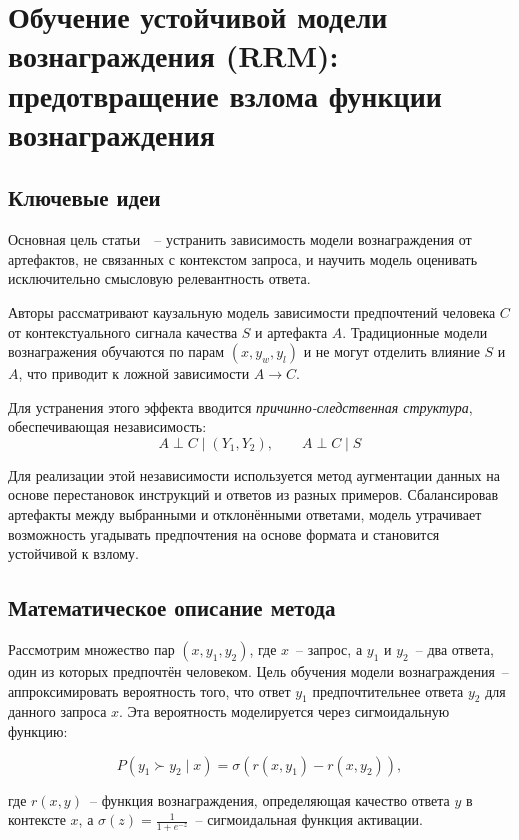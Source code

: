 \section{Обучение устойчивой модели вознаграждения (RRM): предотвращение взлома функции вознаграждения}

\subsection{Ключевые идеи}

Основная цель статьи~\cite{liu2025rrmrobustrewardmodel}~-- устранить зависимость модели вознаграждения от артефактов, не связанных с контекстом запроса, и научить модель оценивать исключительно смысловую релевантность ответа.

Авторы рассматривают каузальную модель зависимости предпочтений человека $C$ от контекстуального сигнала качества $S$ и артефакта $A$.  
Традиционные модели вознагражения обучаются по парам $(x, y_w, y_l)$ и не могут отделить влияние $S$ и $A$, что приводит к ложной зависимости $A \rightarrow C$.

Для устранения этого эффекта вводится \emph{причинно-следственная структура}, обеспечивающая независимость:
$$
A \perp C \mid (Y_1, Y_2), \qquad A \perp C \mid S
$$

Для реализации этой независимости используется метод аугментации данных на основе перестановок инструкций и ответов из разных примеров.  
Сбалансировав артефакты между выбранными и отклонёнными ответами, модель утрачивает возможность угадывать предпочтения на основе формата и становится устойчивой к взлому.

\subsection{Математическое описание метода}

Рассмотрим множество пар $(x, y_1, y_2)$, где $x$~-- запрос, а $y_1$ и $y_2$~-- два ответа, один из которых предпочтён человеком.  
Цель обучения модели вознаграждения~-- аппроксимировать вероятность того, что ответ $y_1$ предпочтительнее ответа $y_2$ для данного запроса $x$.  
Эта вероятность моделируется через сигмоидальную функцию:

\begin{equation}
P(y_1 \succ y_2 \mid x) = \sigma(r(x, y_1) - r(x, y_2)),
\end{equation}

где $r(x, y)$~-- функция вознаграждения, определяющая качество ответа $y$ в контексте $x$,  
а $\sigma(z) = \frac{1}{1 + e^{-z}}$~-- сигмоидальная функция активации.  

